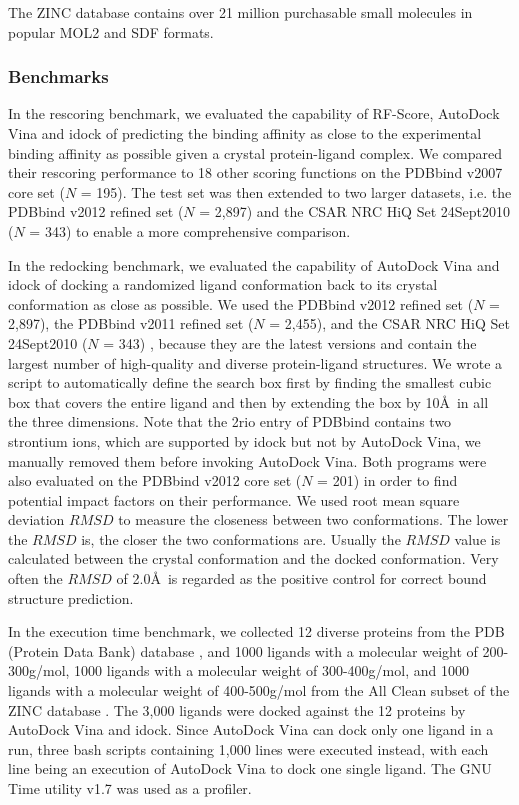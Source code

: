 \documentclass[10pt]{article}
\begin{document}
The ZINC database contains over 21 million purchasable small molecules in popular MOL2 and SDF formats.

\subsubsection*{Benchmarks}
In the rescoring benchmark, we evaluated the capability of RF-Score, AutoDock Vina and idock of predicting the binding affinity as close to the experimental binding affinity as possible given a crystal protein-ligand complex. We compared their rescoring performance to 18 other scoring functions on the PDBbind v2007 core set ($N$ = 195). The test set was then extended to two larger datasets, i.e. the PDBbind v2012 \cite{529,530} refined set ($N$ = 2,897) and the CSAR NRC HiQ Set 24Sept2010 ($N$ = 343) \cite{857,960} to enable a more comprehensive comparison.

In the redocking benchmark, we evaluated the capability of AutoDock Vina and idock of docking a randomized ligand conformation back to its crystal conformation as close as possible. We used the PDBbind v2012 \cite{529,530} refined set ($N$ = 2,897), the PDBbind v2011 refined set ($N$ = 2,455), and the CSAR NRC HiQ Set 24Sept2010 ($N$ = 343) \cite{857,960}, because they are the latest versions and contain the largest number of high-quality and diverse protein-ligand structures. We wrote a script to automatically define the search box first by finding the smallest cubic box that covers the entire ligand and then by extending the box by 10\AA\ in all the three dimensions. Note that the 2rio entry of PDBbind contains two strontium ions, which are supported by idock but not by AutoDock Vina, we manually removed them before invoking AutoDock Vina. Both programs were also evaluated on the PDBbind v2012 core set ($N$ = 201) in order to find potential impact factors on their performance. We used root mean square deviation $RMSD$ to measure the closeness between two conformations. The lower the $RMSD$ is, the closer the two conformations are. Usually the $RMSD$ value is calculated between the crystal conformation and the docked conformation. Very often the $RMSD$ of 2.0\AA\ is regarded as the positive control for correct bound structure prediction. 

In the execution time benchmark, we collected 12 diverse proteins from the PDB (Protein Data Bank) database \cite{540,537}, and 1000 ligands with a molecular weight of 200-300g/mol, 1000 ligands with a molecular weight of 300-400g/mol, and 1000 ligands with a molecular weight of 400-500g/mol from the All Clean subset of the ZINC database \cite{532,1178}. The 3,000 ligands were docked against the 12 proteins by AutoDock Vina and idock. Since AutoDock Vina can dock only one ligand in a run, three bash scripts containing 1,000 lines were executed instead, with each line being an execution of AutoDock Vina to dock one single ligand. The GNU Time utility v1.7 was used as a profiler.
\end{document}
